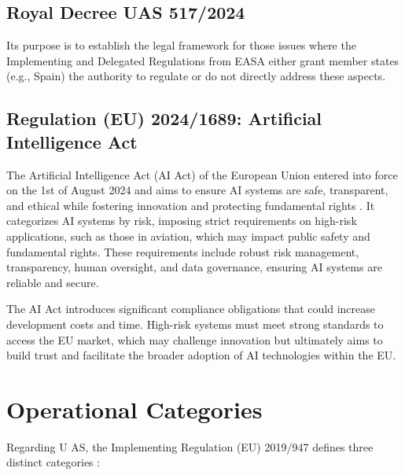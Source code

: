 \subsection{Royal Decree UAS 517/2024}

Its purpose is to establish the legal framework for those issues where the Implementing and Delegated Regulations from EASA either grant member states (e.g., Spain) the authority to regulate or do not directly address these aspects.

\subsection{Regulation (EU) 2024/1689: Artificial Intelligence Act}

The Artificial Intelligence Act (AI Act) of the European Union entered into force on the 1st of August 2024 \autocite{AIActIntoForce} and aims to ensure AI systems are safe, transparent, and ethical while fostering innovation and protecting fundamental rights \autocite{eu-1689-2024}. It categorizes AI systems by risk, imposing strict requirements on high-risk applications, such as those in aviation, which may impact public safety and fundamental rights. These requirements include robust risk management, transparency, human oversight, and data governance, ensuring AI systems are reliable and secure.

The AI Act introduces significant compliance obligations that could increase development costs and time. High-risk systems must meet strong standards to access the EU market, which may challenge innovation but ultimately aims to build trust and facilitate the broader adoption of AI technologies within the EU.

\section{Operational Categories}

Regarding U AS, the Implementing Regulation (EU) 2019/947 defines three distinct
categories \autocite{eu-947-2019}:

